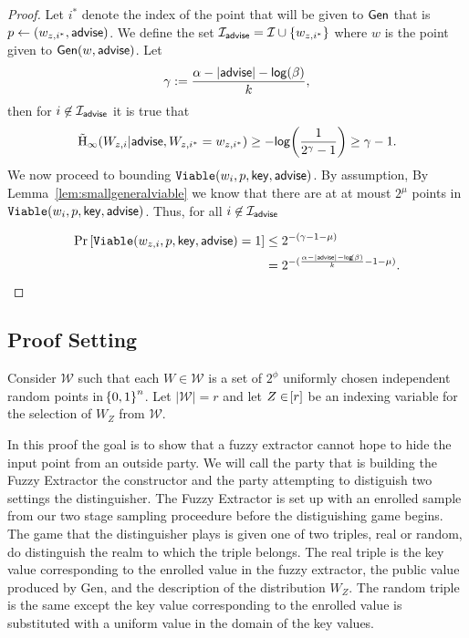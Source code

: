 \begin{proof}
Let $i^*$ denote the index of the point that will be given to ${\mathsf{Gen}}$ that is $p\leftarrow (w_{z,i^*}, {\mathsf{advise}})$.  We define the set $\mathcal{I}_{\mathsf{advise}} = \mathcal{I} \cup \{w_{z,i^*}\}$ where $w$ is the point given to ${\mathsf{Gen}}(w, {\mathsf{advise}})$.  
Let \[\gamma:=\frac{\alpha -|{\mathsf{advise}}| - \mathsf{log}\!\left(\beta\right)}{k},\] 
then for $i\not\in \mathcal{I}_{{\mathsf{advise}}}$ it is true that 
\[
\tilde{\mathrm{H}}_\infty(W_{z,i} | {\mathsf{advise}}, W_{z,i^*}= w_{z,i^*}) \ge -\mathsf{log}\!\left(\frac{1}{2^{\gamma}-1}\right) \ge \gamma-1.
\]
We now proceed to bounding $\mathtt{Viable}(w_i, p, \mathsf{key}, {\mathsf{advise}})$.  By assumption, By Lemma~\ref{lem:smallgeneralviable} we know that there are at at moust $2^\mu$ points in $\mathtt{Viable}(w_i, p, \mathsf{key}, {\mathsf{advise}})$.  Thus, for all $i\not \in\mathcal{I}_{{\mathsf{advise}}}$ 

\begin{align*}
\Pr\left[\mathtt{Viable}(w_{z,i}, p, \mathsf{key}, {\mathsf{advise}}) = 1 \right]&\le 2^{- (\gamma-1 -\mu)}\\
&=2^{-(\frac{\alpha-|{\mathsf{advise}}|-\mathsf{log}\!\left(\beta\right)}{k}-1-\mu)}.
\end{align*}


\here
\end{proof}

\subsection{Proof Setting}
Consider $\mathcal{W}$ such that each $W \in \mathcal{W}$ is a set of $2^{\phi}$ uniformly chosen independent random points in $\!\left\{ 0,1 \right\}^{n}$. 
Let $|\mathcal{W}| = r$ and let $Z \in \!\left[r\right]$ be an indexing variable for the selection of $W_Z$ from $\mathcal{W}$. 

In this proof the goal is to show that a fuzzy extractor cannot hope to hide the input point from an outside party. 
We will call the party that is building the Fuzzy Extractor the constructor and the party attempting to distiguish two settings the distinguisher. 
The Fuzzy Extractor is set up with an enrolled sample from our two stage sampling proceedure before the distiguishing game begins.
The game that the distinguisher plays is given one of two triples, real or random, do distinguish the realm to which the triple belongs. 
The real triple is the key value corresponding to the enrolled value in the fuzzy extractor, the public value produced by Gen, and the description of the distribution $W_Z$.
The random triple is the same except the key value corresponding to the enrolled value is substituted with a uniform value in the domain of the key values.

